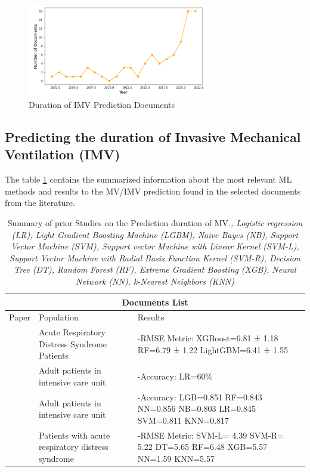 \documentclass[journal]{IEEEtran} %
\begin{document}
\begin{figure}[htp]
    \centering
    \includegraphics[width=8cm]{Project2-Report_FAA/figures/imv.png}
    \caption{Duration of IMV Prediction Documents}
    \label{fig:imv_docs}
\end{figure}


\subsection{Predicting the duration of Invasive Mechanical Ventilation (IMV)}

The table \ref{tab:papers_imv} contains the summarized information about the most relevant ML methods and results to the MV/IMV prediction found in the selected documents from the literature.

\begin{table}[]
    \centering
    \begin{tabular}{ |p{1cm}||p{3cm}|p{3cm}|  }
        \hline
        \multicolumn{3}{|c|}{Documents List} \\
        \hline
        Paper & Population & Results\\
        \hline
        \cite{Sayed2021} & Acute Respiratory Distress Syndrome Patients & -RMSE Metric: XGBoost=6.81 ± 1.18 RF=6.79 ± 1.22 LightGBM=6.41 ± 1.55
    \\
    \hline
         \cite{Figueroa-Casas2015} & Adult patients in intensive care unit & -Accuracy: LR=60\%
    \\
    \hline
        \cite{Wang2023} & Adult patients in intensive care unit & -Accuracy: LGB=0.851 RF=0.843 NN=0.856 NB=0.803 LR=0.845 SVM=0.811 KNN=0.817
    \\
    \hline
        \cite{Wang2022} & Patients with acute respiratory distress syndrome & -RMSE Metric: SVM-L= 4.39 SVM-R= 5.22 DT=5.65 RF=6.48 XGB=5.57 NN=1.59 KNN=5.57
    \\
        \hline
    \end{tabular}
    \caption{Summary of prior Studies on the Prediction duration of MV.\emph{, Logistic regression (LR), Light Gradient Boosting Machine (LGBM), Naive Bayes (NB), Support Vector Machine (SVM), Support vector Machine with Linear Kernel (SVM-L), Support Vector Machine with Radial Basis Function Kernel (SVM-R), Decision Tree (DT), Random Forest (RF), Extreme Gradient Boosting (XGB), Neural Network (NN), k-Nearest Neighbors (KNN)}}
    \label{tab:papers_imv}
\end{table}
\end{document}

